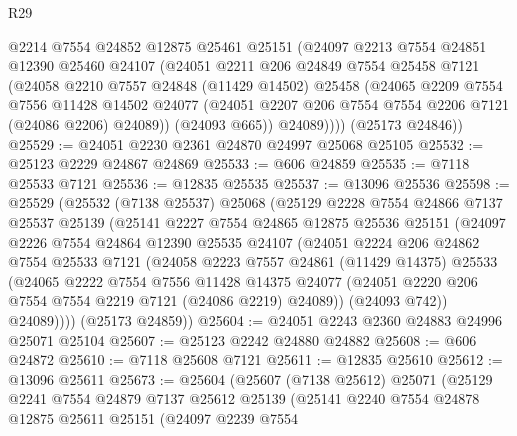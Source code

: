 \begin{lexlean}{R29}
\begin{coremodule}
          @2214
          @7554
          @24852
          @12875
          @25461
          @25151
          (@24097
            @2213
            @7554
            @24851
            @12390
            @25460
            @24107
            (@24051
              @2211
              @206
              @24849
              @7554
              @25458
              @7121
              (@24058
                @2210
                @7557
                @24848
                (@11429 @14502)
                @25458
                (@24065
                  @2209
                  @7554
                  @7556
                  @11428
                  @14502
                  @24077
                  (@24051 @2207 @206 @7554 @7554 @2206 @7121 (@24086 @2206) @24089))
                (@24093 @665))
              @24089))))
      (@25173 @24846))
@25529 := @24051 @2230 @2361 @24870 @24997 @25068 @25105
@25532 := @25123 @2229 @24867 @24869
@25533 := @606 @24859
@25535 := @7118 @25533 @7121
@25536 := @12835 @25535
@25537 := @13096 @25536
@25598 := @25529
    (@25532
      (@7138 @25537)
      @25068
      (@25129
        @2228
        @7554
        @24866
        @7137
        @25537
        @25139
        (@25141
          @2227
          @7554
          @24865
          @12875
          @25536
          @25151
          (@24097
            @2226
            @7554
            @24864
            @12390
            @25535
            @24107
            (@24051
              @2224
              @206
              @24862
              @7554
              @25533
              @7121
              (@24058
                @2223
                @7557
                @24861
                (@11429 @14375)
                @25533
                (@24065
                  @2222
                  @7554
                  @7556
                  @11428
                  @14375
                  @24077
                  (@24051 @2220 @206 @7554 @7554 @2219 @7121 (@24086 @2219) @24089))
                (@24093 @742))
              @24089))))
      (@25173 @24859))
@25604 := @24051 @2243 @2360 @24883 @24996 @25071 @25104
@25607 := @25123 @2242 @24880 @24882
@25608 := @606 @24872
@25610 := @7118 @25608 @7121
@25611 := @12835 @25610
@25612 := @13096 @25611
@25673 := @25604
    (@25607
      (@7138 @25612)
      @25071
      (@25129
        @2241
        @7554
        @24879
        @7137
        @25612
        @25139
        (@25141
          @2240
          @7554
          @24878
          @12875
          @25611
          @25151
          (@24097
            @2239
            @7554

\end{coremodule}
\end{lexlean}
